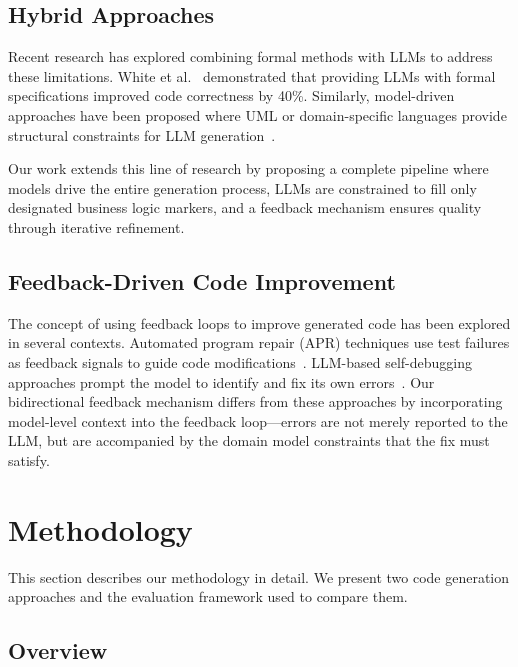 \documentclass[11pt,a4paper]{article}
\begin{document}
\subsection{Hybrid Approaches}

Recent research has explored combining formal methods with LLMs to address these limitations. White et al.~\cite{white2023prompt} demonstrated that providing LLMs with formal specifications improved code correctness by 40\%. Similarly, model-driven approaches have been proposed where UML or domain-specific languages provide structural constraints for LLM generation~\cite{li2024combining}.

Our work extends this line of research by proposing a complete pipeline where models drive the entire generation process, LLMs are constrained to fill only designated business logic markers, and a feedback mechanism ensures quality through iterative refinement.

\subsection{Feedback-Driven Code Improvement}

The concept of using feedback loops to improve generated code has been explored in several contexts. Automated program repair (APR) techniques use test failures as feedback signals to guide code modifications~\cite{goues2019automated}. LLM-based self-debugging approaches prompt the model to identify and fix its own errors~\cite{chen2023self}. Our bidirectional feedback mechanism differs from these approaches by incorporating model-level context into the feedback loop---errors are not merely reported to the LLM, but are accompanied by the domain model constraints that the fix must satisfy.

\newpage
\section{Methodology}
\label{sec:methodology}

This section describes our methodology in detail. We present two code generation approaches and the evaluation framework used to compare them.

\subsection{Overview}
\end{document}
